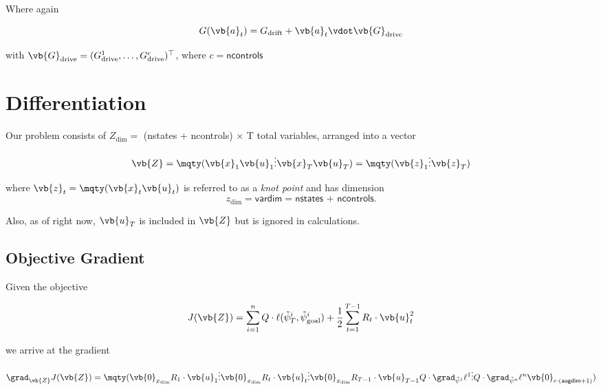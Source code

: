 \documentclass{article}
\newcommand{\isopsi}{\tilde \psi}
\begin{document}
Where again 

$$
G(\vb{a}_t) = G_{\text{drift}} + \vb{a}_t \vdot \vb{G}_{\text{drive}}
$$

with $\vb{G}_{\text{drive}} = (G^1_{\text{drive}}, \dots, G^c_{\text{drive}})^\top$, where $c = \textsf{ncontrols}$

\newpage
\section{Differentiation}

Our problem consists of $Z_{\dim}=$ \textsf{(nstates + ncontrols) $\times$ T} total variables, arranged into a vector

\begin{equation}
  \vb{Z} = \mqty(
    \vb{x}_1 \\
    \vb{u}_1 \\
    \vdots \\
    \vb{x}_T \\
    \vb{u}_T \\
  ) =
  \mqty(
    \vb{z}_1 \\
    \vdots \\ 
    \vb{z}_T
  )
\end{equation}

where $\vb{z}_t = \mqty( \vb{x}_t \\ \vb{u}_t)$ is referred to as a \textit{knot point} and has dimension 
$$
z_{\dim} = \textsf{vardim} = \textsf{nstates + ncontrols}.
$$ 

Also, as of right now, $\vb{u}_T$ is included in $\vb{Z}$ but is ignored in calculations. 

\subsection{Objective Gradient}

Given the objective

\begin{equation}
  J(\vb{Z}) = \sum_{i=1}^n Q \cdot \ell(\isopsi_T^i, \isopsi_\text{goal}^i) + \frac{1}{2} \sum_{t=1}^{T-1} R_t \cdot \vb{u}_t^2 
\end{equation}

we arrive at the gradient

\begin{equation}
  \grad_{\vb{Z}} J(\vb{Z}) = \mqty(
    \vb{0}_{x_{\dim}} \\
    R_1 \cdot \vb{u}_1 \\
    \vdots \\
    \vb{0}_{x_{\dim}} \\
    R_t \cdot \vb{u}_t \\
    \vdots \\
    \vb{0}_{x_{\dim}} \\
    R_{T-1} \cdot \vb{u}_{T-1} \\
    Q \cdot \grad_{\isopsi^1} \ell^1 \\
    \vdots \\
    Q \cdot \grad_{\isopsi^n} \ell^n \\
    \vb{0}_{c \cdot (\textsf{augdim} + 1)}
  ) 
\end{equation}
\end{document}
